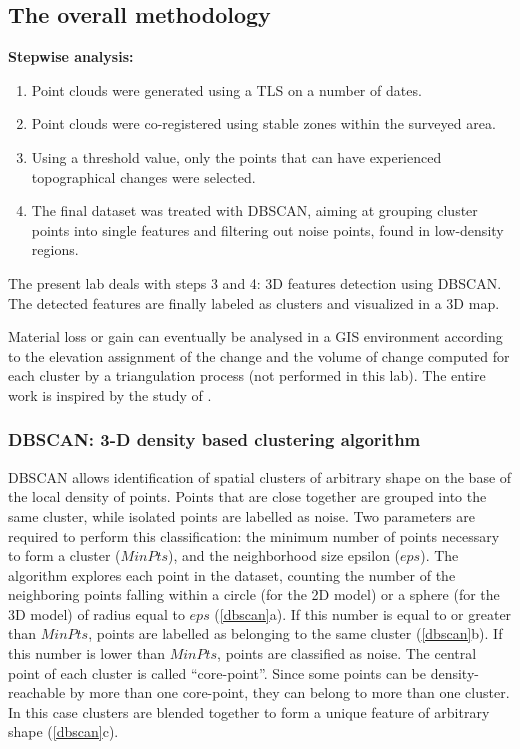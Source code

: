 \documentclass[
]{article}
\providecommand{\tightlist}{%
  \setlength{\itemsep}{0pt}\setlength{\parskip}{0pt}}
\begin{document}
\subsection{The overall methodology}\label{the-overall-methodology-1}

\textbf{Stepwise analysis:}

\begin{enumerate}
\def\labelenumi{\arabic{enumi}.}
\tightlist
\item
  Point clouds were generated using a TLS on a number of dates.
\item
  Point clouds were co-registered using stable zones within the surveyed area.
\item
  Using a threshold value, only the points that can have experienced topographical changes were selected.
\item
  The final dataset was treated with DBSCAN, aiming at grouping cluster points into single features and filtering out noise points, found in low-density regions.
\end{enumerate}

The present lab deals with steps 3 and 4: 3D features detection using DBSCAN.
The detected features are finally labeled as clusters and visualized in a 3D map.

Material loss or gain can eventually be analysed in a GIS environment according to the elevation assignment of the change and the volume of change computed for each cluster by a triangulation process (not performed in this lab).
The entire work is inspired by the study of \citet{micheletti_geomorphological_2017}.

\subsubsection{DBSCAN: 3-D density based clustering algorithm}\label{dbscan-3-d-density-based-clustering-algorithm}

DBSCAN allows identification of spatial clusters of arbitrary shape on the base of the local density of points.
Points that are close together are grouped into the same cluster, while isolated points are labelled as noise.
Two parameters are required to perform this classification: the minimum number of points necessary to form a cluster (\(MinPts\)), and the neighborhood size epsilon (\(eps\)).
The algorithm explores each point in the dataset, counting the number of the neighboring points falling within a circle (for the 2D model) or a sphere (for the 3D model) of radius equal to \(eps\) (\autoref{dbscan}a).
If this number is equal to or greater than \(MinPts\), points are labelled as belonging to the same cluster (\autoref{dbscan}b).
If this number is lower than \(MinPts\), points are classified as noise.
The central point of each cluster is called ``core-point''.
Since some points can be density-reachable by more than one core-point, they can belong to more than one cluster.
In this case clusters are blended together to form a unique feature of arbitrary shape (\autoref{dbscan}c).
\end{document}
